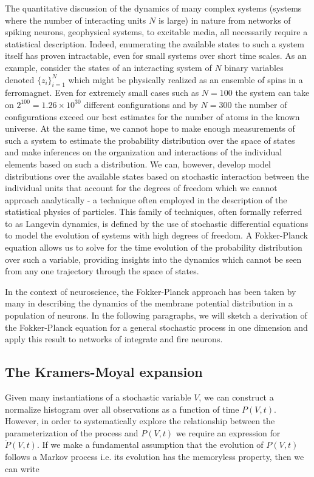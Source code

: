 \documentclass{ucetd}
\begin{document}
The quantitative discussion of the dynamics of many complex systems (systems where the number of interacting units $N$ is large) in nature from networks of spiking neurons, geophysical systems, to excitable media, all necessarily require a statistical description. Indeed, enumerating the available states to such a system itself has proven intractable, even for small systems over short time scales. As an example, consider the states of an interacting system of $N$ binary variables denoted $\{z_{i}\}_{i=1}^{N}$ which might be physically realized as an ensemble of spins in a ferromagnet. Even for extremely small cases such as $N=100$ the system can take on $2^{100} = 1.26\times 10^{30}$ different configurations and by $N=300$ the number of configurations exceed our best estimates for the number of atoms in the known universe. At the same time, we cannot hope to make enough measurements of such a system to estimate the probability distribution over the space of states and make inferences on the organization and interactions of the individual elements based on such a distribution. We can, however, develop model distributions over the available states based on stochastic interaction between the individual units that account for the degrees of freedom which we cannot approach analytically - a technique often employed in the description of the statistical physics of particles. This family of techniques, often formally referred to as Langevin dynamics, is defined by the use of stochastic differential equations to model the evolution of systems with high degrees of freedom. A Fokker-Planck equation allows us to solve for the time evolution of the probability distribution over such a variable, providing insights into the dynamics which cannot be seen from any one trajectory through the space of states. 

In the context of neuroscience, the Fokker-Planck approach has been taken by many in describing the dynamics of the membrane potential distribution in a population of neurons. In the following paragraphs, we will sketch a derivation of the Fokker-Planck equation for a general stochastic process in one dimension and apply this result to networks of integrate and fire neurons.

\subsection{The Kramers-Moyal expansion}

Given many instantiations of a stochastic variable $V$, we can construct a normalize histogram over all observations as a function of time $P(V,t)$. However, in order to systematically explore the relationship between the parameterization of the process and $P(V,t)$ we require an expression for $\dot{P}(V,t)$. If we make a fundamental assumption that the evolution of $P(V,t)$ follows a Markov process i.e. its evolution has the memoryless property, then we can write
\end{document}
